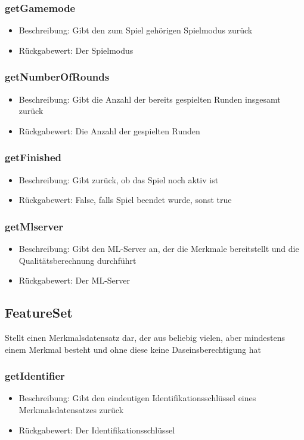 \documentclass[a4paper]{scrreprt}
\begin{document}
   \subsubsection{getGamemode}
      \begin{itemize}
              \item Beschreibung: Gibt den zum Spiel gehörigen Spielmodus zurück
              \item Rückgabewert: Der Spielmodus
      \end{itemize}
   \subsubsection{getNumberOfRounds}
      \begin{itemize}
              \item Beschreibung: Gibt die Anzahl der bereits gespielten Runden insgesamt zurück
              \item Rückgabewert: Die Anzahl der gespielten Runden
      \end{itemize}     
   \subsubsection{getFinished}
      \begin{itemize}
              \item Beschreibung: Gibt zurück, ob das Spiel noch aktiv ist
              \item Rückgabewert: False, falls Spiel beendet wurde, sonst true
      \end{itemize}
   \subsubsection{getMlserver}
      \begin{itemize}
              \item Beschreibung: Gibt den ML-Server an, der die Merkmale bereitstellt und die Qualitätsberechnung durchführt
              \item Rückgabewert: Der ML-Server
      \end{itemize}
      
   \subsection{FeatureSet}
   Stellt einen Merkmalsdatensatz dar, der aus beliebig vielen, aber mindestens einem Merkmal besteht und ohne diese keine Daseinsberechtigung hat
   \subsubsection{getIdentifier}
   \begin{itemize}
      \item Beschreibung: Gibt den eindeutigen Identifikationsschlüssel eines Merkmalsdatensatzes zurück
      \item Rückgabewert: Der Identifikationsschlüssel
   \end{itemize}
\end{document}
